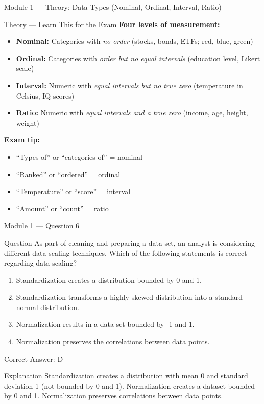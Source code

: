 \documentclass[aspectratio=169,10pt]{beamer}
\newcommand{\question}[1]{%
	\begin{block}{Question}
		#1
	\end{block}
}
\newcommand{\options}[4]{%
	\begin{enumerate}[label=\Alph*.,leftmargin=*]
		\item #1
		\item #2
		\item #3
		\item #4
	\end{enumerate}
}
\newcommand{\answerbox}[1]{%
	\begin{exampleblock}{Correct Answer: #1}
	\end{exampleblock}
}
\newcommand{\explain}[1]{%
	\begin{block}{Explanation}
		\small #1
	\end{block}
}
\newcommand{\theory}[1]{%
	\begin{block}{Theory --- Learn This for the Exam}
		\small #1
	\end{block}
}
\begin{document}
	\begin{frame}{Module 1 --- Theory: Data Types (Nominal, Ordinal, Interval, Ratio)}
		\theory{
			\textbf{Four levels of measurement:}
			\begin{itemize}
				\item \textbf{Nominal:} Categories with \emph{no order} (stocks, bonds, ETFs; red, blue, green)
				\item \textbf{Ordinal:} Categories with \emph{order but no equal intervals} (education level, Likert scale)
				\item \textbf{Interval:} Numeric with \emph{equal intervals but no true zero} (temperature in Celsius, IQ scores)
				\item \textbf{Ratio:} Numeric with \emph{equal intervals and a true zero} (income, age, height, weight)
			\end{itemize}
			\textbf{Exam tip:}
			\begin{itemize}
				\item ``Types of'' or ``categories of'' = nominal
				\item ``Ranked'' or ``ordered'' = ordinal
				\item ``Temperature'' or ``score'' = interval
				\item ``Amount'' or ``count'' = ratio
			\end{itemize}
		}
	\end{frame}
	
	\begin{frame}{Module 1 --- Question 6}
		\question{As part of cleaning and preparing a data set, an analyst is considering different data scaling techniques. Which of the following statements is correct regarding data scaling?}
		\options{Standardization creates a distribution bounded by 0 and 1.}{Standardization transforms a highly skewed distribution into a standard normal distribution.}{Normalization results in a data set bounded by -1 and 1.}{Normalization preserves the correlations between data points.}
		\answerbox{D}
		\explain{Standardization creates a distribution with mean 0 and standard deviation 1 (not bounded by 0 and 1). Normalization creates a dataset bounded by 0 and 1. Normalization preserves correlations between data points.}
	\end{frame}
	
\end{document}
